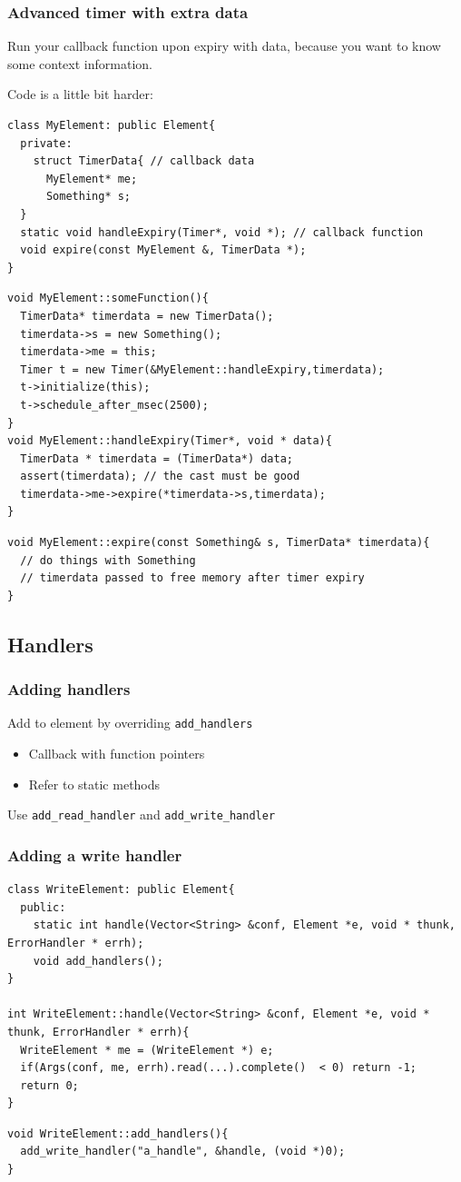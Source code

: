 \documentclass{beamer}
\begin{document}
\begin{frame}
\frametitle{Advanced timer with extra data}
Run your callback function upon expiry with data, because you want to know some context information.

Code is a little bit harder:
\begin{lstlisting}
class MyElement: public Element{
  private:
    struct TimerData{ // callback data
      MyElement* me;
      Something* s;
  }
  static void handleExpiry(Timer*, void *); // callback function
  void expire(const MyElement &, TimerData *);
}
\end{lstlisting}
\begin{lstlisting}
void MyElement::someFunction(){
  TimerData* timerdata = new TimerData();
  timerdata->s = new Something();
  timerdata->me = this;
  Timer t = new Timer(&MyElement::handleExpiry,timerdata);
  t->initialize(this);
  t->schedule_after_msec(2500);
}
void MyElement::handleExpiry(Timer*, void * data){
  TimerData * timerdata = (TimerData*) data;
  assert(timerdata); // the cast must be good
  timerdata->me->expire(*timerdata->s,timerdata);
}
\end{lstlisting}
\begin{lstlisting}
void MyElement::expire(const Something& s, TimerData* timerdata){
  // do things with Something
  // timerdata passed to free memory after timer expiry
}
\end{lstlisting}
\end{frame}



\subsection{Handlers} %
\label{sub:handlers}
\begin{frame}[fragile]
\frametitle{Adding handlers}
Add to element by overriding \lstinline!add_handlers!
\begin{itemize}
	\item Callback with function pointers
	\item Refer to static methods
\end{itemize}
Use \lstinline!add_read_handler! and \lstinline!add_write_handler!
\end{frame}

\begin{frame}
\frametitle{Adding a write handler}
\begin{lstlisting}
class WriteElement: public Element{
  public:
    static int handle(Vector<String> &conf, Element *e, void * thunk, ErrorHandler * errh);
    void add_handlers();
}

int WriteElement::handle(Vector<String> &conf, Element *e, void * thunk, ErrorHandler * errh){
  WriteElement * me = (WriteElement *) e;
  if(Args(conf, me, errh).read(...).complete()  < 0) return -1;
  return 0;
}
\end{lstlisting}
\begin{lstlisting}
void WriteElement::add_handlers(){
  add_write_handler("a_handle", &handle, (void *)0);
}
\end{lstlisting}
\end{frame}
\end{document}
